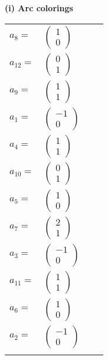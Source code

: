 \documentclass[1p]{elsarticle_modified}
\theoremstyle{definition}
\begin{document}
\flushleft \textbf{(i) Arc colorings}\\
\begin{tabular}{m{7pt} m{180pt} m{7pt} m{180pt} }
\flushright $a_{8}=$&$\begin{pmatrix}1\\0\end{pmatrix}$ \\
\flushright $a_{12}=$&$\begin{pmatrix}0\\1\end{pmatrix}$ \\
\flushright $a_{9}=$&$\begin{pmatrix}1\\1\end{pmatrix}$ \\
\flushright $a_{1}=$&$\begin{pmatrix}-1\\0\end{pmatrix}$ \\
\flushright $a_{4}=$&$\begin{pmatrix}1\\1\end{pmatrix}$ \\
\flushright $a_{10}=$&$\begin{pmatrix}0\\1\end{pmatrix}$ \\
\flushright $a_{5}=$&$\begin{pmatrix}1\\0\end{pmatrix}$ \\
\flushright $a_{7}=$&$\begin{pmatrix}2\\1\end{pmatrix}$ \\
\flushright $a_{3}=$&$\begin{pmatrix}-1\\0\end{pmatrix}$ \\
\flushright $a_{11}=$&$\begin{pmatrix}1\\1\end{pmatrix}$ \\
\flushright $a_{6}=$&$\begin{pmatrix}1\\0\end{pmatrix}$ \\
\flushright $a_{2}=$&$\begin{pmatrix}-1\\0\end{pmatrix}$\\&\end{tabular}
\end{document}
